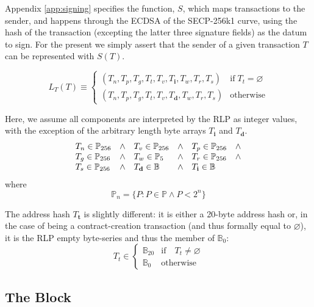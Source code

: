 \documentclass[9pt,oneside]{amsart}
\begin{document}
\begin{multicols}{2}
Appendix \ref{app:signing} specifies the function, $S$, which maps transactions to the sender, and happens through the ECDSA of the SECP-256k1 curve, using the hash of the transaction (excepting the latter three signature fields) as the datum to sign. For the present we simply assert that the sender of a given transaction $T$ can be represented with $S(T)$.

\begin{equation}
L_T(T) \equiv \begin{cases}
(T_n, T_p, T_g, T_t, T_v, T_\mathbf{i}, T_w, T_r, T_s) & \text{if} \; T_t = \varnothing\\
(T_n, T_p, T_g, T_t, T_v, T_\mathbf{d}, T_w, T_r, T_s) & \text{otherwise}
\end{cases}
\end{equation}

Here, we assume all components are interpreted by the RLP as integer values, with the exception of the arbitrary length byte arrays $T_\mathbf{i}$ and $T_\mathbf{d}$.
\begin{equation}
\begin{array}[t]{lclclc}
T_n \in \mathbb{P}_{256} & \wedge & T_v \in \mathbb{P}_{256} & \wedge & T_p \in \mathbb{P}_{256} & \wedge \\
T_g \in \mathbb{P}_{256} & \wedge & T_w \in \mathbb{P}_5 & \wedge & T_r \in \mathbb{P}_{256} & \wedge \\
T_s \in \mathbb{P}_{256} & \wedge & T_\mathbf{d} \in \mathbb{B} & \wedge & T_\mathbf{i} \in \mathbb{B}
\end{array}
\end{equation}
where
\begin{equation}
\mathbb{P}_n = \{ P: P \in \mathbb{P} \wedge P < 2^n \}
\end{equation}

The address hash $T_\mathbf{t}$ is slightly different: it is either a 20-byte address hash or, in the case of being a contract-creation transaction (and thus formally equal to $\varnothing$), it is the RLP empty byte-series and thus the member of $\mathbb{B}_0$:
\begin{equation}
T_t \in \begin{cases} \mathbb{B}_{20} & \text{if} \quad T_t \neq \varnothing \\
\mathbb{B}_{0} & \text{otherwise}\end{cases}
\end{equation}

\subsection{The Block} \label{ch:block}


\end{multicols}
\end{document}
